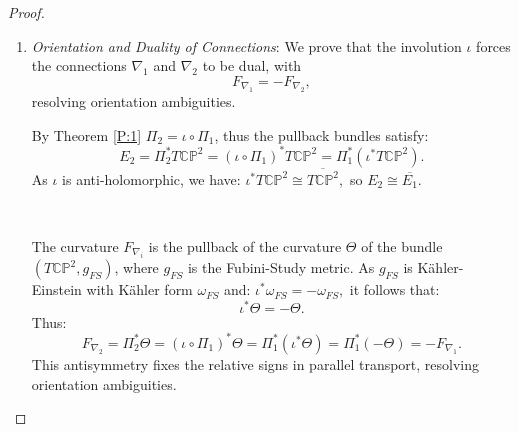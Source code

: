 \documentclass[runningheads]{llncs}
\begin{document}
\begin{proof}
\begin{enumerate}
    \item {\it Orientation and Duality of Connections}:
We prove that the involution $\iota$ forces the connections $\nabla_1$ and $\nabla_2$ to be dual, with 
\[
F_{\nabla_1} = -F_{\nabla_2},
\]
resolving orientation ambiguities.

By Theorem \ref{P:1} $\Pi_2 = \iota \circ \Pi_1$, thus the pullback bundles satisfy:
\[
E_2 = \Pi_2^* T \mathbb{CP}^2 = (\iota \circ \Pi_1)^* T \mathbb{CP}^2 = \Pi_1^* \left( \iota^* T \mathbb{CP}^2 \right).
\]
As $\iota$ is anti-holomorphic, we have:
$
\iota^* T \mathbb{CP}^2 \cong \overline{T \mathbb{CP}^2},$
so $E_2 \cong \overline{E_1}.$

\, 

The curvature $F_{\nabla_i}$ is the pullback of the curvature $\Theta$ of the bundle $\left( T \mathbb{CP}^2, g_{FS} \right)$, where $g_{FS}$ is the Fubini-Study metric. As $g_{FS}$ is Kähler-Einstein with Kähler form $\omega_{FS}$ and:
$\iota^* \omega_{FS} = -\omega_{FS},$
it follows that:
\[
\iota^* \Theta = -\Theta.
\]
Thus:
\[
F_{\nabla_2} = \Pi_2^* \Theta = (\iota \circ \Pi_1)^* \Theta = \Pi_1^* \left( \iota^* \Theta \right) = \Pi_1^* ( -\Theta ) = - F_{\nabla_1}.
\]
This antisymmetry fixes the relative signs in parallel transport, resolving orientation ambiguities.


\end{enumerate}
\end{proof}
\end{document}
